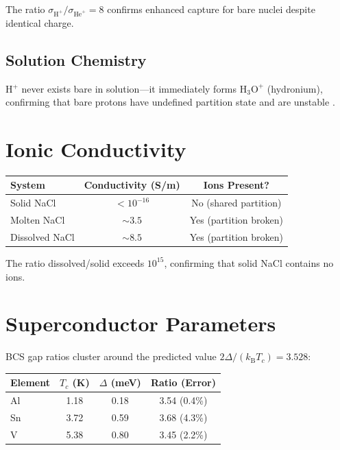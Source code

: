 \documentclass[twocolumn,10pt,a4paper]{article}
\theoremstyle{plain}
\theoremstyle{definition}
\theoremstyle{remark}
\newcommand{\kB}{k_{\mathrm{B}}}
\begin{document}
The ratio $\sigma_{\mathrm{H}^+}/\sigma_{\mathrm{He}^+} = 8$ confirms enhanced capture for bare nuclei despite identical charge.

\subsection{Solution Chemistry}

H$^+$ never exists bare in solution---it immediately forms $\mathrm{H_3O}^+$ (hydronium), confirming that bare protons have undefined partition state and are unstable \cite{marx2006}.

\section{Ionic Conductivity}
\label{sec:val_conductivity}

\begin{center}
\begin{tabular}{lcc}
\toprule
System & Conductivity (S/m) & Ions Present? \\
\midrule
Solid NaCl & $<10^{-16}$ & No (shared partition) \\
Molten NaCl & $\sim 3.5$ & Yes (partition broken) \\
Dissolved NaCl & $\sim 8.5$ & Yes (partition broken) \\
\bottomrule
\end{tabular}
\end{center}

The ratio dissolved/solid exceeds $10^{15}$, confirming that solid NaCl contains no ions.

\section{Superconductor Parameters}
\label{sec:val_super}

BCS gap ratios cluster around the predicted value $2\Delta/(\kB T_c) = 3.528$:

\begin{center}
\begin{tabular}{lccc}
\toprule
Element & $T_c$ (K) & $\Delta$ (meV) & Ratio (Error) \\
\midrule
Al & 1.18 & 0.18 & 3.54 (0.4\%) \\
Sn & 3.72 & 0.59 & 3.68 (4.3\%) \\
V & 5.38 & 0.80 & 3.45 (2.2\%) \\
\bottomrule
\end{tabular}
\end{center}
\end{document}
